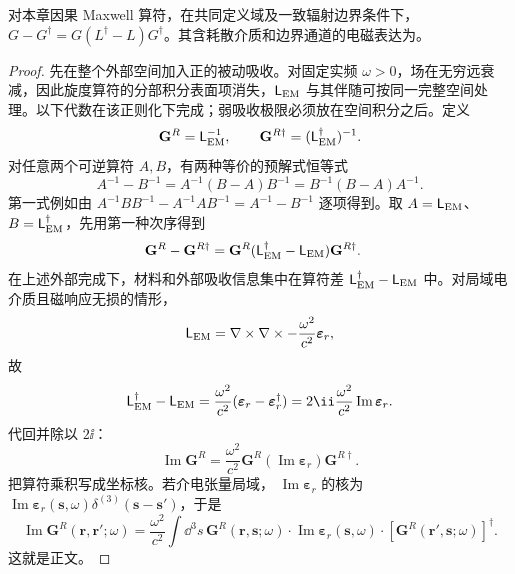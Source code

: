 \begin{proposition}
对本章因果 Maxwell 算符，在共同定义域及一致辐射边界条件下，$G-G^\dagger=G(L^\dagger-L)G^\dagger$。其含耗散介质和边界通道的电磁表达为。
\end{proposition}
\begin{proof}
先在整个外部空间加入正的被动吸收。对固定实频 $\omega>0$，场在无穷远衰减，因此旋度算符的分部积分表面项消失，$\mathsf L_{\rm EM}$ 与其伴随可按同一完整空间处理。以下代数在该正则化下完成；弱吸收极限必须放在空间积分之后。定义
\[
\mathbf G^R=\mathsf L_{\rm EM}^{-1},
\qquad
\mathbf G^{R\dagger}=(\mathsf L_{\rm EM}^{\dagger})^{-1}.
\]
对任意两个可逆算符 $A,B$，有两种等价的预解式恒等式
\[
A^{-1}-B^{-1}
=A^{-1}(B-A)B^{-1}
=B^{-1}(B-A)A^{-1}.
\]
第一式例如由
$A^{-1}BB^{-1}-A^{-1}AB^{-1}=A^{-1}-B^{-1}$ 逐项得到。取
$A=\mathsf L_{\rm EM}$、$B=\mathsf L_{\rm EM}^{\dagger}$，先用第一种次序得到
\begin{align*}
\mathbf G^R-\mathbf G^{R\dagger}
&=\mathbf G^R
(\mathsf L_{\rm EM}^{\dagger}-\mathsf L_{\rm EM})
\mathbf G^{R\dagger}.
\end{align*}
在上述外部完成下，材料和外部吸收信息集中在算符差 $\mathsf L_{\rm EM}^{\dagger}-\mathsf L_{\rm EM}$ 中。对局域电介质且磁响应无损的情形，
\[
\mathsf L_{\rm EM}
=\nabla\times\nabla\times
-\frac{\omega^2}{c^2}\boldsymbol\varepsilon_r,
\]
故
\[
\mathsf L_{\rm EM}^{\dagger}-\mathsf L_{\rm EM}
=\frac{\omega^2}{c^2}
(\boldsymbol\varepsilon_r-\boldsymbol\varepsilon_r^{\dagger})
=2\ii\frac{\omega^2}{c^2}
\operatorname{Im}\boldsymbol\varepsilon_r.
\]
代回并除以 $2\ii$：
\[
\operatorname{Im}\mathbf G^R
=\frac{\omega^2}{c^2}
\mathbf G^R
(\operatorname{Im}\boldsymbol\varepsilon_r)
\mathbf G^{R\dagger}.
\]
把算符乘积写成坐标核。若介电张量局域，
$\operatorname{Im}\boldsymbol\varepsilon_r$ 的核为
$\operatorname{Im}\boldsymbol\varepsilon_r(\mathbf s,\omega)
\delta^{(3)}(\mathbf s-\mathbf s')$，于是
\[
\boxed{
\operatorname{Im}\mathbf G^R(\mathbf r,\mathbf r';\omega)
=\frac{\omega^2}{c^2}\int\dd^3s\,
\mathbf G^R(\mathbf r,\mathbf s;\omega)
\cdot\operatorname{Im}\boldsymbol\varepsilon_r(\mathbf s,\omega)
\cdot[\mathbf G^R(\mathbf r',\mathbf s;\omega)]^\dagger}.
\]
这就是正文。


\end{proof}
